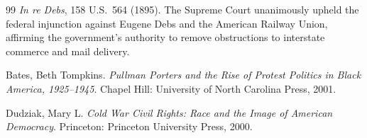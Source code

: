 \documentclass[12pt,openany]{book}
\begin{document}
\begin{thebibliography}{99}
\textit{In re Debs}, 158 U.S.~564 (1895). The Supreme Court unanimously upheld the federal injunction against Eugene Debs and the American Railway Union, affirming the government's authority to remove obstructions to interstate commerce and mail delivery.

Bates, Beth Tompkins. \textit{Pullman Porters and the Rise of Protest Politics in Black America, 1925--1945}. Chapel Hill: University of North Carolina Press, 2001.

Dudziak, Mary L. \textit{Cold War Civil Rights: Race and the Image of American Democracy}. Princeton: Princeton University Press, 2000.

\end{thebibliography}
\end{document}
